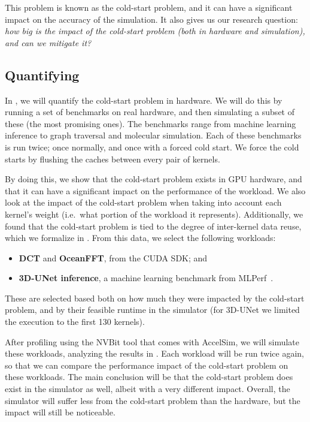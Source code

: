This problem is known as the cold-start problem, and it can have a significant impact on the accuracy of the simulation.
It also gives us our research question: \textit{how big is the impact of the cold-start problem (both in hardware and simulation), and can we mitigate it?}

\subsection{Quantifying}\label{subsec:quantifying}
In , we will quantify the cold-start problem in hardware.
We will do this by running a set of benchmarks on real hardware, and then simulating a subset of these (the most promising ones).
The benchmarks range from machine learning inference to graph traversal and molecular simulation.
Each of these benchmarks is run twice; once normally, and once with a forced cold start.
We force the cold starts by flushing the caches between every pair of kernels.

By doing this, we show that the cold-start problem exists in GPU hardware, and that it can have a significant impact on the performance of the workload.
We also look at the impact of the cold-start problem when taking into account each kernel's weight (i.e.\ what portion of the workload it represents).
Additionally, we found that the cold-start problem is tied to the degree of inter-kernel data reuse, which we formalize in .
From this data, we select the following workloads:
\begin{itemize}
    \item \textbf{DCT} and \textbf{OceanFFT}, from the CUDA SDK; and
    \item \textbf{3D-UNet inference}, a machine learning benchmark from MLPerf~\cite{mlperf}.
\end{itemize}
These are selected based both on how much they were impacted by the cold-start problem, and by their feasible runtime in the simulator (for 3D-UNet we limited the execution to the first 130 kernels).

After profiling using the NVBit tool that comes with AccelSim, we will simulate these workloads, analyzing the results in .
Each workload will be run twice again, so that we can compare the performance impact of the cold-start problem on these workloads.
The main conclusion will be that the cold-start problem does exist in the simulator as well, albeit with a very different impact.
Overall, the simulator will suffer less from the cold-start problem than the hardware, but the impact will still be noticeable.

